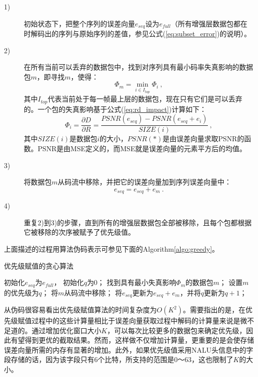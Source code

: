 \begin{description}
	\item[1)] 初始状态下，把整个序列的误差向量$e_{seq}$设为$e_{full}$（所有增强层数据包都在时解码出的序列与原始序列的差值，参见公式(\ref{eq:subset_error})的说明）。
	\item[2)] 在所有当前可以丢弃的数据包中，找到对序列具有最小码率失真影响的数据包$m$，即寻找$m$，使得：
	\begin{equation}
	\label{eq:R-D_impact_m}
	\Phi_m = \min_{i \in I_{top}} \Phi_i \: ,
	\end{equation}
	其中$I_{top}$代表当前处于每一帧最上层的数据包，现在只有它们是可以丢弃的。一个包的失真影响基于公式(\ref{eq:rd_impact})计算如下： 
	\begin{equation}
	\label{eq:R-D_impact_i}
	\Phi_i = \dfrac{\partial D}{\partial R} = \dfrac{PSNR(e_{seq}) - PSNR(e_{seq} + e_i)}{SIZE(i)} \: ,
	\end{equation}
	其中$SIZE(i)$是数据包$i$的大小，$PSNR(*)$是由误差向量求取PSNR的函数。PSNR是由MSE定义的，而MSE就是误差向量的元素平方后的均值。
	\item[3)]将数据包$m$从码流中移除，并把它的误差向量加到序列误差向量中：
	\begin{equation}
	\label{eq:error_update}
	e_{seq} = e_{seq} + e_m \: .
	\end{equation}
	\item[4)]重复2)到3)的步骤，直到所有的增强层数据包全部被移除，且每个包都根据它被移除的次序被赋予了优先级值。
\end{description}

上面描述的过程用算法伪码表示可参见下面的Algorithm\ref{algo:greedy}。

\begin{algorithm}
	\caption{优先级赋值的贪心算法}
	\label{algo:greedy}
	\begin{algorithmic}
		\STATE 初始化$e_{seq}$为$e_{full}$， 初始化$q$为0；
		\STATE 找到具有最小失真影响$\Phi_m$的数据包$m$；
		\ENDFOR
		\STATE 设置$m$的优先级为$q$；
		\STATE 将$m$从码流中移除；
		\STATE 将$e_{seq}$更新为$e_{seq} + e_m$，并将$q$更新为$q+1$；
		\ENDWHILE
	\end{algorithmic}
\end{algorithm}

从伪码很容易看出优先级赋值算法的时间复杂度为$O(K^2)$。需要指出的是，在优先级赋值过程中的这些计算量相比于误差向量获取过程中解码的计算量来说是微不足道的。通过增加优化窗口大小$K$，可以每次比较更多的数据包来确定优先级，因此有望得到更优的截取结果。然而，这样做不仅增加计算量，更重要的是会使存储误差向量所需的内存有显著的增加。此外，如果优先级值采用NALU头信息中的字段存储的话，因为该字段只有6个比特，所支持的范围是0～63，这也限制了$K$的大小。

